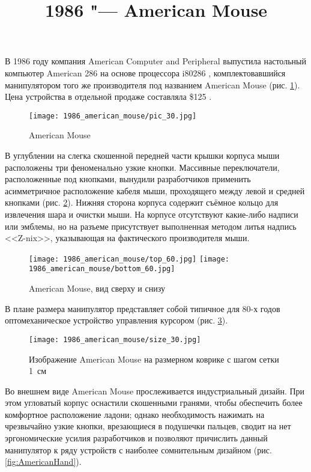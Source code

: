 \documentclass[11pt, a4paper]{article}
\begin{document}
\title{1986 "--- American Mouse}
\date{}
\maketitle
{}
В 1986 году компания American Computer and Peripheral выпустила настольный компьютер American 286 на основе процессора i80286 \cite{adv}, комплектовавшийся манипулятором того же производителя под названием American Mouse (рис. \ref{fig:AmericanPic}). Цена устройства в отдельной продаже составляла \$125 \cite{review}.

\begin{figure}[h]
    \centering
    \texttt{[image: 1986\_american\_mouse/pic\_30.jpg]}
    \caption{American Mouse}
    \label{fig:AmericanPic}
\end{figure}

В углублении на слегка скошенной передней части крышки корпуса мыши расположены три феноменально узкие кнопки. Массивные переключатели, расположенные под кнопками, вынудили разработчиков применить асимметричное расположение кабеля мыши, проходящего между левой и средней кнопками (рис. \ref{AmericanTopAndBottom}). Нижняя сторона корпуса содержит съёмное кольцо для извлечения шара и очистки мыши. На корпусе отсутствуют какие-либо надписи или эмблемы, но на разъеме присутствует выполненная методом литья надпись <<Z-nix>>, указывающая на фактического производителя мыши.

\begin{figure}[h]
    \centering
    \texttt{[image: 1986\_american\_mouse/top\_60.jpg]}
    \texttt{[image: 1986\_american\_mouse/bottom\_60.jpg]}
    \caption{American Mouse, вид сверху и снизу}
    \label{AmericanTopAndBottom}
\end{figure}

В плане размера манипулятор представляет собой типичное для 80-х годов оптомеханическое устройство управления курсором (рис. \ref{fig:AmericanSize}).

\begin{figure}[h]
    \centering
    \texttt{[image: 1986\_american\_mouse/size\_30.jpg]}
    \caption{Изображение American Mouse на размерном коврике с шагом сетки 1~см}
    \label{fig:AmericanSize}
\end{figure}

Во внешнем виде American Mouse прослеживается индустриальный дизайн. При этом угловатый корпус оснастили скошенными гранями, чтобы обеспечить более комфортное расположение ладони; однако необходимость нажимать на чрезвычайно узкие кнопки, врезающиеся в подушечки пальцев, сводит на нет эргономические усилия разработчиков и позволяют причислить данный манипулятор к ряду устройств с наиболее сомнительным дизайном (рис. \ref{fig:AmericanHand}).
\end{document}
